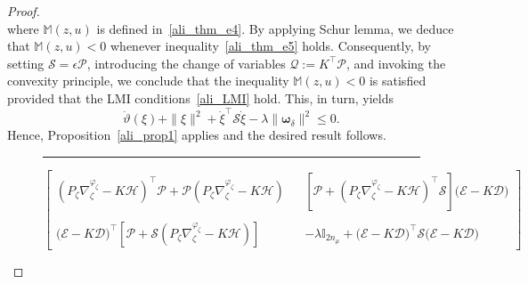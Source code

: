 \begin{proof}
\begin{equation}
\end{equation}
where $\mathbb{M}\left( z,u \right)$ is defined in~\eqref{ali_thm_e4}. By applying Schur lemma, we deduce that $\mathbb{M}(z,u) < 0$ whenever inequality~\eqref{ali_thm_e5} holds. Consequently, by setting $\mathcal{S} = \epsilon \mathcal{P}$, introducing the change of variables $\mathcal{Q} := K^{\top} \mathcal{P}$, and invoking the convexity principle, we conclude that the inequality $\mathbb{M}(z,u) < 0$ is satisfied provided that the LMI conditions~\eqref{ali_LMI} hold. This, in turn, yields
\begin{equation}\label{omega_delta_e1}
\dot{\vartheta}(\xi) + \| \xi \|^{2}  + \dot{\xi}^{\top} \mathcal{S} \dot{\xi} - \lambda \| \bm{\omega}_{\delta} \|^{2} \leq 0.
\end{equation}
Hence, Proposition~\ref{ali_prop1} applies and the desired result follows.




\begin{figure}
\hrule
\vspace{0.2cm}
%
{\small
\begin{equation}\label{ali_thm_e4}
\begin{bmatrix}
\left( P_{\zeta} \nabla^{\varphi_{\zeta}}_{\zeta} - K  \mathcal{H} \right)^{\top} \mathcal{P} 
+\mathcal{P} \left( P_{\zeta} \nabla^{\varphi_{\zeta}}_{\zeta} - K  \mathcal{H} \right)
&&
\left[\mathcal{P} + \left( P_{\zeta} \nabla^{\varphi_{\zeta}}_{\zeta} - K  \mathcal{H} \right)^{\top} \mathcal{S}\right] \Big( \mathcal{E} - K  \mathcal{D}\Big)
\\~\\
\Big( \mathcal{E} - K  \mathcal{D}\Big)^{\top} \left[ \mathcal{P} + \mathcal{S} \left( P_{\zeta} \nabla^{\varphi_{\zeta}}_{\zeta} - K  \mathcal{H} \right) \right] && 
- \lambda \mathbb{I}_{2n_{\mu}} + \Big( \mathcal{E} - K  \mathcal{D}\Big)^{\top} \mathcal{S} \Big( \mathcal{E} - K  \mathcal{D}\Big)
\end{bmatrix}
\end{equation}
}
\bigskip

{\small

}
\end{figure}
\end{proof}
